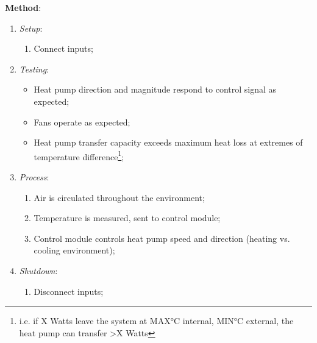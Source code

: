 \documentclass{report}
\begin{document}
\textbf{Method}:
\begin{enumerate}
    \item \textit{Setup}:
    \begin{enumerate}
        \item Connect inputs;
    \end{enumerate}
    \item \textit{Testing}:
    \begin{itemize}
        \item Heat pump direction and magnitude respond to control signal as expected;
        \item Fans operate as expected;
        \item Heat pump transfer capacity exceeds maximum heat loss at extremes of temperature difference\footnote{i.e. if X Watts leave the system at MAX°C internal, MIN°C external, the heat pump can transfer >X Watts};
    \end{itemize}
    \item \textit{Process}:
    \begin{enumerate}
        \item Air is circulated throughout the environment;
        \item Temperature is measured, sent to control module;
        \item Control module controls heat pump speed and direction (heating vs. cooling environment);
    \end{enumerate}
    \item \textit{Shutdown}:
    \begin{enumerate}
        \item Disconnect inputs;
    \end{enumerate}
\end{enumerate}
\end{document}
